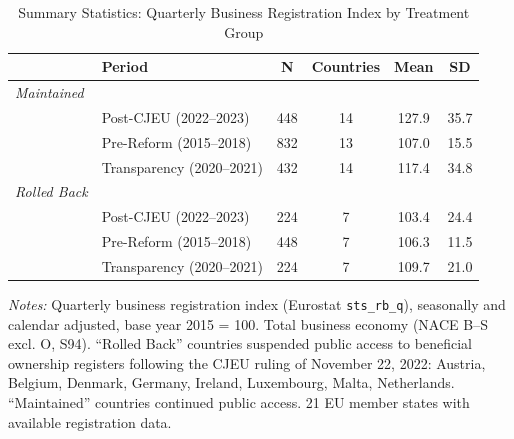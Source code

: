 \begin{table}[t]
\centering
\begin{threeparttable}
\caption{Summary Statistics: Quarterly Business Registration Index by Treatment Group}
\label{tab:sumstats}
\begin{tabular}{llcccc}
\toprule
 & Period & N & Countries & Mean & SD \\
\midrule
\textit{Maintained} & & & & & \\
 & Post-CJEU (2022--2023) & 448 & 14 & 127.9 & 35.7 \\
 & Pre-Reform (2015--2018) & 832 & 13 & 107.0 & 15.5 \\
 & Transparency (2020--2021) & 432 & 14 & 117.4 & 34.8 \\
\textit{Rolled Back} & & & & & \\
 & Post-CJEU (2022--2023) & 224 & 7 & 103.4 & 24.4 \\
 & Pre-Reform (2015--2018) & 448 & 7 & 106.3 & 11.5 \\
 & Transparency (2020--2021) & 224 & 7 & 109.7 & 21.0 \\
\bottomrule
\end{tabular}
\begin{tablenotes}[flushleft]
\small
\item \textit{Notes:} Quarterly business registration index (Eurostat \texttt{sts\_rb\_q}), seasonally and calendar adjusted, base year 2015 = 100. Total business economy (NACE B--S excl. O, S94). ``Rolled Back'' countries suspended public access to beneficial ownership registers following the CJEU ruling of November 22, 2022: Austria, Belgium, Denmark, Germany, Ireland, Luxembourg, Malta, Netherlands. ``Maintained'' countries continued public access. 21 EU member states with available registration data.
\end{tablenotes}
\end{threeparttable}
\end{table}
